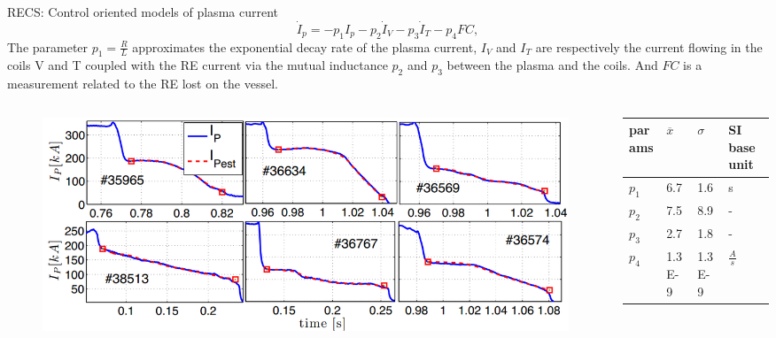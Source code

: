 \documentclass{beamer}
\begin{document}
\begin{frame}[allowframebreaks]{RECS: Control oriented models of plasma current}
\scriptsize
\begin{equation}
	\dot{I}_p = -p_1I_p - p_2\dot{I}_V -p_3 \dot{I}_T - p_4FC,
\end{equation}
The parameter $p_1 = \frac{R}{L}$ approximates the exponential decay rate of the plasma current, $I_V$ and $I_T$ are respectively the current flowing in the coils V and T coupled with the RE current via the mutual inductance $p_2$ and $p_3$ between the plasma and the coils. And $FC$ is a measurement related to the RE lost on the vessel.\\

\begin{columns}
	\begin{column}{0.6\textwidth}
        \begin{figure}
        \vspace*{-0.8cm}
        \centering
            \includegraphics[width=1\textwidth]{models/ipl.png}
        \end{figure}
    \end{column}
    \begin{column}{0.4\textwidth}
\begin{table}
	\tiny
	\begin{center}
		\begin{tabular}{ | l | l | l | l |}
			\hline
			params & $\overline{x}$ & $\sigma$ & SI base unit\\ \hline
			$p_1$ & 6.7 & 1.6 & \si{\s} \\ \hline 
			$p_2$ & 7.5 & 8.9 & - \\ \hline
			$p_3$ & 2.7 & 1.8 & - \\ \hline 
			$p_4$ & 1.3E-9 & 1.3E-9& $\frac{A}{s}$ \\ \hline 
		\end{tabular}
	\end{center}
\end{table}	
    \end{column}
    
\end{columns}

\end{frame}
\end{document}
